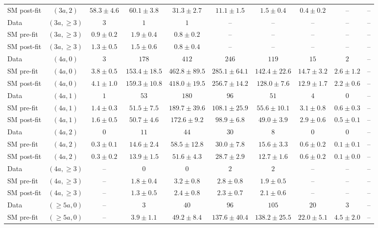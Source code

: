 \begin{table}[h!]
{\begin{tabular}{lccccccccc}
 SM post-fit & $(3a,2)$ & $58.3\pm4.6$ & $60.1\pm3.8$ & $31.3\pm2.7$ & $11.1\pm1.5$ & $1.5\pm0.4$ & $0.4\pm0.2$ & -- & -- \\[0.5ex]
 Data & $(3a,\geq 3)$ & $3$ & $1$ & $1$ & -- & -- & -- & -- & -- \\[0.5ex]
 SM pre-fit & $(3a,\geq 3)$ & $0.9\pm0.2$ & $1.9\pm0.4$ & $0.8\pm0.2$ & -- & -- & -- & -- & -- \\[0.5ex]
 SM post-fit & $(3a,\geq 3)$ & $1.3\pm0.5$ & $1.5\pm0.6$ & $0.8\pm0.4$ & -- & -- & -- & -- & -- \\[0.5ex]
 Data & $(4a,0)$ & $3$ & $178$ & $412$ & $246$ & $119$ & $15$ & $2$ & -- \\[0.5ex]
 SM pre-fit & $(4a,0)$ & $3.8\pm0.5$ & $153.4\pm18.5$ & $462.8\pm89.5$ & $285.1\pm64.1$ & $142.4\pm22.6$ & $14.7\pm3.2$ & $2.6\pm1.2$ & -- \\[0.5ex]
 SM post-fit & $(4a,0)$ & $4.1\pm1.0$ & $159.3\pm10.8$ & $418.0\pm19.5$ & $256.7\pm14.2$ & $128.0\pm7.6$ & $12.9\pm1.7$ & $2.2\pm0.6$ & -- \\[0.5ex]
 Data & $(4a,1)$ & $1$ & $53$ & $180$ & $96$ & $51$ & $4$ & $0$ & -- \\[0.5ex]
 SM pre-fit & $(4a,1)$ & $1.4\pm0.3$ & $51.5\pm7.5$ & $189.7\pm39.6$ & $108.1\pm25.9$ & $55.6\pm10.1$ & $3.1\pm0.8$ & $0.6\pm0.3$ & -- \\[0.5ex]
 SM post-fit & $(4a,1)$ & $1.6\pm0.5$ & $50.7\pm4.6$ & $172.6\pm9.2$ & $98.9\pm6.8$ & $49.0\pm3.9$ & $2.9\pm0.6$ & $0.5\pm0.1$ & -- \\[0.5ex]
 Data & $(4a,2)$ & $0$ & $11$ & $44$ & $30$ & $8$ & $0$ & $0$ & -- \\[0.5ex]
 SM pre-fit & $(4a,2)$ & $0.3\pm0.1$ & $14.6\pm2.4$ & $58.5\pm12.8$ & $30.0\pm7.8$ & $15.6\pm3.3$ & $0.6\pm0.2$ & $0.1\pm0.1$ & -- \\[0.5ex]
 SM post-fit & $(4a,2)$ & $0.3\pm0.2$ & $13.9\pm1.5$ & $51.6\pm4.3$ & $28.7\pm2.9$ & $12.7\pm1.6$ & $0.6\pm0.2$ & $0.1\pm0.0$ & -- \\[0.5ex]
 Data & $(4a,\geq 3)$ & -- & $0$ & $0$ & $2$ & $2$ & -- & -- & -- \\[0.5ex]
 SM pre-fit & $(4a,\geq 3)$ & -- & $1.8\pm0.4$ & $3.2\pm0.8$ & $2.8\pm0.8$ & $1.9\pm0.5$ & -- & -- & -- \\[0.5ex]
 SM post-fit & $(4a,\geq 3)$ & -- & $1.3\pm0.5$ & $2.4\pm0.8$ & $2.3\pm0.7$ & $2.1\pm0.6$ & -- & -- & -- \\[0.5ex]
 Data & $(\geq 5a,0)$ & -- & $3$ & $40$ & $96$ & $105$ & $20$ & $3$ & -- \\[0.5ex]
 SM pre-fit & $(\geq 5a,0)$ & -- & $3.9\pm1.1$ & $49.2\pm8.4$ & $137.6\pm40.4$ & $138.2\pm25.5$ & $22.0\pm5.1$ & $4.5\pm2.0$ & -- \\[0.5ex]

\end{tabular}}
\end{table}
